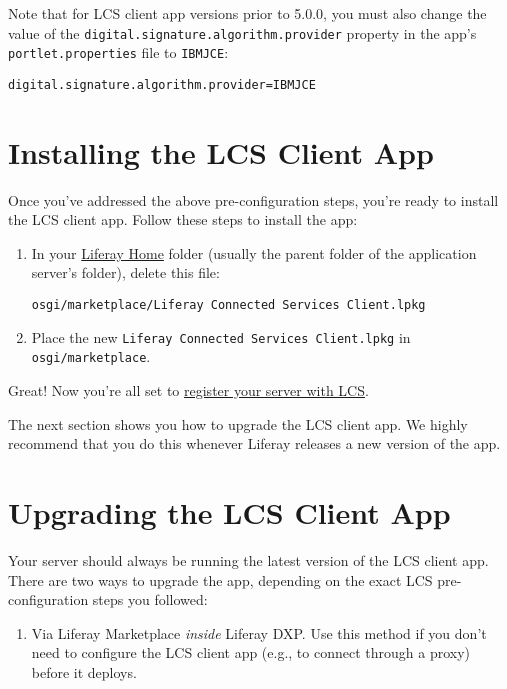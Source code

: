 Note that for LCS client app versions prior to 5.0.0, you must also
change the value of the \texttt{digital.signature.algorithm.provider}
property in the app's \texttt{portlet.properties} file to
\texttt{IBMJCE}:

\begin{verbatim}
digital.signature.algorithm.provider=IBMJCE
\end{verbatim}

\section{Installing the LCS Client
App}\label{installing-the-lcs-client-app}

Once you've addressed the above pre-configuration steps, you're ready to
install the LCS client app. Follow these steps to install the app:

\begin{enumerate}
\def\labelenumi{\arabic{enumi}.}
\item
  In your
  \href{/docs/7-2/deploy/-/knowledge_base/d/liferay-home}{Liferay Home}
  folder (usually the parent folder of the application server's folder),
  delete this file:

\begin{verbatim}
osgi/marketplace/Liferay Connected Services Client.lpkg
\end{verbatim}
\item
  Place the new \texttt{Liferay\ Connected\ Services\ Client.lpkg} in
  \texttt{osgi/marketplace}.
\end{enumerate}

Great! Now you're all set to
\href{/docs/7-2/deploy/-/knowledge_base/d/activating-your-liferay-dxp-server-with-lcs}{register
your server with LCS}.

The next section shows you how to upgrade the LCS client app. We highly
recommend that you do this whenever Liferay releases a new version of
the app.

\section{Upgrading the LCS Client
App}\label{upgrading-the-lcs-client-app}

Your server should always be running the latest version of the LCS
client app. There are two ways to upgrade the app, depending on the
exact LCS pre-configuration steps you followed:

\begin{enumerate}
\def\labelenumi{\arabic{enumi}.}
\tightlist
\item
  Via Liferay Marketplace \emph{inside} Liferay DXP. Use this method if
  you don't need to configure the LCS client app (e.g., to connect
  through a proxy) before it deploys.
\end{enumerate}

